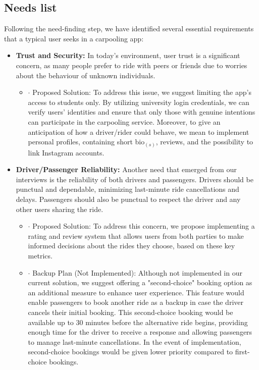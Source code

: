 \documentclass{article}
\begin{document}
\subsection{Needs list}
Following the need-finding step, we have identified several essential requirements that a typical user seeks in a carpooling app: 

\begin{itemize}
    \item \textbf{Trust and Security:} In today's environment, user trust is a significant concern, as many people prefer to ride with peers or friends due to worries about the behaviour of unknown individuals. 
    \begin{itemize}
        \item $\cdot$ Proposed Solution: To address this issue, we suggest limiting the app's access to students only. By utilizing university login credentials, we can verify users' identities and ensure that only those with genuine intentions can participate in the carpooling service. Moreover, to give an anticipation of how a driver/rider could behave, we mean to implement personal profiles, containing short bio$_{(s)}$, reviews, and the possibility to link Instagram accounts.
    \end{itemize}
    \item \textbf{Driver/Passenger Reliability:} Another need that emerged from our interviews is the reliability of both drivers and passengers. Drivers should be punctual and dependable, minimizing last-minute ride cancellations and delays. Passengers should also be punctual to respect the driver and any other users sharing the ride.
    \begin{itemize}
        \item $\cdot$ Proposed Solution: To address this concern, we propose implementing a rating and review system that allows users from both parties to make informed decisions about the rides they choose, based on these key metrics.
        \item $\cdot$ Backup Plan (Not Implemented): Although not implemented in our current solution, we suggest offering a "second-choice" booking option as an additional measure to enhance user experience. This feature would enable     passengers to book another ride as a backup in case the driver cancels their       initial booking. This second-choice booking would be available up to 30         minutes before the alternative ride begins, providing enough time for the       driver to receive a response and allowing passengers to manage last-minute      cancellations. In the event of implementation, second-choice bookings would be given lower priority compared to first-choice bookings.
    \end{itemize}
\end{itemize}
\newpage
\end{document}

